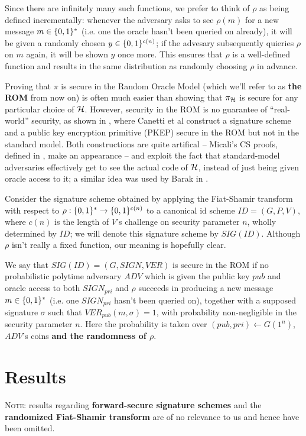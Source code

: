 \documentclass[12pt,twoside]{article}
\begin{document}
\begin{itemize}
Since there are infinitely many such functions, we prefer to think of $\rho$ as 
being defined incrementally: whenever the adversary asks to see $\rho(m)$ for
a new message $m \in \{0,1\}^{*}$ (i.e. one the oracle hasn't been queried on
already), it will be given a randomly chosen $y \in \{0,1\}^{c(n)}$; 
if the advesary subsequently quieries $\rho$ on $m$ again, it will be shown 
$y$ once more. This ensures that $\rho$ is a well-defined function and results 
in the same distribution as randomly choosing $\rho$ in advance.

Proving that $\pi$ is secure in the Random Oracle Model (which we'll
refer to as {\bf the ROM} from now on) is often much easier than showing that
$\pi_{\mathcal{H}}$ is secure for any particular choice of $\mathcal{H}$. However, security
in the ROM is no guarantee of ``real-world'' security, as shown in
\cite{canetti:romfails}, where Canetti et al construct a signature scheme and 
a public key encryption primitive (PKEP) secure in the ROM but not in the 
standard model. Both constructions are quite artifical -- Micali's
CS proofs, defined in \cite{micali:csproofs}, make an appearance -- and exploit 
the fact that standard-model adversaries effectively get to see the actual 
code of $\mathcal{H}$, instead of just being given oracle access to it; a similar 
idea was used by Barak in \cite{barak:nonblackbox}.

Consider the signature scheme obtained by applying the Fiat-Shamir
transform with respect to $\rho: \{0,1\}^{*} \to \{0,1\}^{c(n)}$ to a canonical 
id scheme $ID = (G,P,V)$, where $c(n)$ is the length of $V$'s challenge on
security parameter $n$, wholly determined by $ID$; we will denote this
signature scheme by $SIG(ID)$. Although $\rho$ isn't really a fixed function,
our meaning is hopefully clear. 

We say that $SIG(ID) = (G, SIGN, VER)$ is secure in the ROM if no probabilistic 
polytime adversary $ADV$ which is given the public key $pub$ and oracle access 
to both $SIGN_{pri}$ and $\rho$ succeeds in producing a new message 
$m \in \{0,1\}^{*}$ (i.e. one $SIGN_{pri}$ hasn't been queried on), together with 
a supposed signature $\sigma$ such that $VER_{pub}(m,\sigma) = 1$, with 
probability non-negligible in the security parameter $n$. Here the probability
is taken over $(pub,pri) \gets G(1^n)$, $ADV$'s coins {\bf and the randomness 
of $\rho$}.

\end{itemize}

\section{Results}
\textsc{Note}: results regarding {\bf forward-secure signature schemes} and the 
{\bf randomized Fiat-Shamir transform} are of no relevance to us and hence have been omitted.
\end{document}
